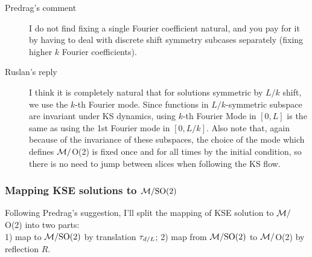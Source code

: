 \begin{description}
\item[Predrag's comment] I do not find fixing a single
Fourier coefficient natural, and you pay for it by having to
deal with discrete shift symmetry subcases separately (fixing
higher $k$ Fourier coefficients).
\item[Ruslan's reply] I think it is completely natural that
for solutions symmetric by $L/k$ shift, we use the $k$-th
Fourier mode. Since functions in $L/k$-symmetric subspace are
invariant under KS dynamics, using $k$-th Fourier Mode in
$[0, L]$ is the same as using the 1st Fourier mode in $[0,
L/k]$.  Also note that, again because of the invariance of
these subspaces, the choice of the mode which defines
${\cal M}/$O(2) is fixed once and for all times by the initial
condition, so there is no need to jump between slices when
following the KS flow.
\end{description}

\subsubsection{Mapping KSE solutions to ${\cal M}/\textrm{SO}(2)$}

Following Predrag's suggestion, I'll split the mapping of KSE solution to
${\cal M}/$O(2) into two parts:
\\
1) map to ${\cal M}/\textrm{SO}(2)$ by translation $\tau_{d/L}$; 2) map from
${\cal M}/\textrm{SO}(2)$ to ${\cal M}/$O(2) by reflection $R$.

\medskip{}



%
%
%
%
%
%
%
%
%
%
%
%
%
%
%
%
%
%
%

